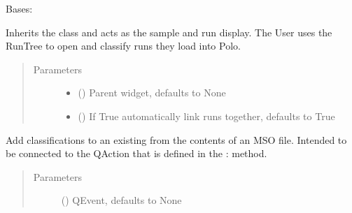 \documentclass[letterpaper,10pt,english]{sphinxmanual}
\begin{document}
\begin{fulllineitems}
\label{\detokenize{polo.widgets:polo.widgets.run_tree.RunTree}}
Bases: 

Inherits the  class and acts as the sample and
run display. The User uses the RunTree to open and classify runs
they load into Polo.
\begin{quote}\begin{description}
\item[{Parameters}] \leavevmode\begin{itemize}
\item {} 
 (\sphinxstyleliteralemphasis{\sphinxupquote{, }}) \textendash{} Parent widget, defaults to None

\item {} 
 (\sphinxstyleliteralemphasis{\sphinxupquote{, }}) \textendash{} If True automatically link runs together, defaults to True

\end{itemize}

\end{description}\end{quote}

\begin{fulllineitems}
\label{\detokenize{polo.widgets:polo.widgets.run_tree.RunTree._add_classifications_from_mso_slot}}
Add classifications to an existing  from the contents of an
MSO file. Intended to be connected to the 
QAction that is defined in the :
{\hyperref[\detokenize{polo.widgets:polo.widgets.run_tree.RunTree.contextMenuEvent}]{}}
method.
\begin{quote}\begin{description}
\item[{Parameters}] \leavevmode
{} (\sphinxstyleliteralemphasis{\sphinxupquote{, }}) \textendash{} QEvent, defaults to None


\end{description}
\end{quote}
\end{fulllineitems}
\end{fulllineitems}
\end{document}
